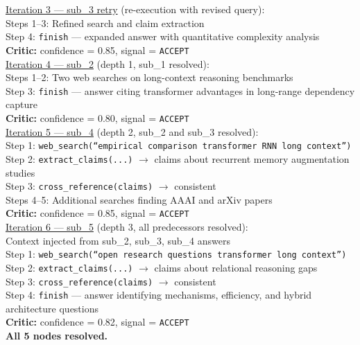 \documentclass[11pt]{article}
\begin{document}
\begin{tcolorbox}[boxstyle, title={Full Agent Trace --- q1}]
\underline{Iteration 3 --- sub\_3 retry} (re-execution with revised query): \\
Steps 1--3: Refined search and claim extraction \\
Step 4: \texttt{finish} --- expanded answer with quantitative complexity analysis \\
\textbf{Critic:} confidence = 0.85, signal = \texttt{ACCEPT} \\[4pt]

\underline{Iteration 4 --- sub\_2} (depth 1, sub\_1 resolved): \\
Steps 1--2: Two web searches on long-context reasoning benchmarks \\
Step 3: \texttt{finish} --- answer citing transformer advantages in long-range dependency capture \\
\textbf{Critic:} confidence = 0.80, signal = \texttt{ACCEPT} \\[4pt]

\underline{Iteration 5 --- sub\_4} (depth 2, sub\_2 and sub\_3 resolved): \\
Step 1: \texttt{web\_search(``empirical comparison transformer RNN long context'')} \\
Step 2: \texttt{extract\_claims(...)} $\to$ claims about recurrent memory augmentation studies \\
Step 3: \texttt{cross\_reference(claims)} $\to$ consistent \\
Steps 4--5: Additional searches finding AAAI and arXiv papers \\
\textbf{Critic:} confidence = 0.85, signal = \texttt{ACCEPT} \\[4pt]

\underline{Iteration 6 --- sub\_5} (depth 3, all predecessors resolved): \\
Context injected from sub\_2, sub\_3, sub\_4 answers \\
Step 1: \texttt{web\_search(``open research questions transformer long context'')} \\
Step 2: \texttt{extract\_claims(...)} $\to$ claims about relational reasoning gaps \\
Step 3: \texttt{cross\_reference(claims)} $\to$ consistent \\
Step 4: \texttt{finish} --- answer identifying mechanisms, efficiency, and hybrid architecture questions \\
\textbf{Critic:} confidence = 0.82, signal = \texttt{ACCEPT} \\[4pt]

\textbf{All 5 nodes resolved.} \\[4pt]


\end{tcolorbox}
\end{document}
